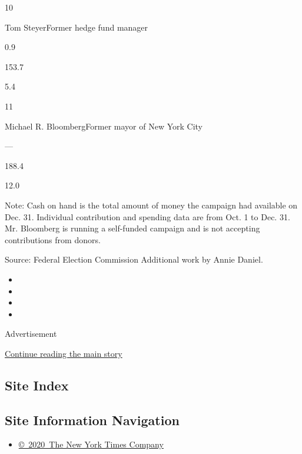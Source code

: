 10

Tom SteyerFormer hedge fund manager

0.9

153.7

5.4

11

Michael R. BloombergFormer mayor of New York City

---

188.4

12.0

Note: Cash on hand is the total amount of money the campaign had
available on Dec. 31. Individual contribution and spending data are from
Oct. 1 to Dec. 31. Mr. Bloomberg is running a self-funded campaign and
is not accepting contributions from donors.

Source: Federal Election Commission \textbar{} Additional work by Annie
Daniel.

\begin{itemize}
\item
\item
\item
\item
\end{itemize}

Advertisement

\protect\hyperlink{after-bottom}{Continue reading the main story}

\hypertarget{site-index}{%
\subsection{Site Index}\label{site-index}}

\hypertarget{site-information-navigation}{%
\subsection{Site Information
Navigation}\label{site-information-navigation}}

\begin{itemize}
\tightlist
\item
  \href{https://help.nytimes.com/hc/en-us/articles/115014792127-Copyright-notice}{©~2020~The
  New York Times Company}
\end{itemize}

